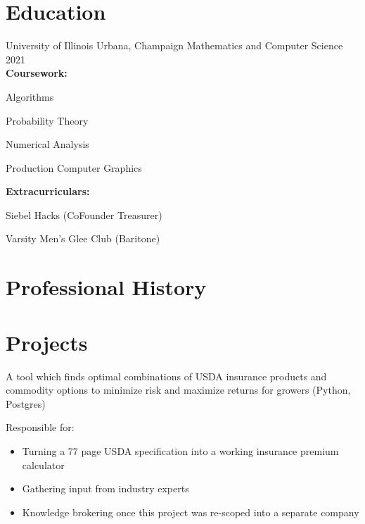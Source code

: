 \documentclass[hidelinks]{scrartcl}
\begin{document}
\color{textcolor}

\flushleft
{\Huge\bfseries{\color{mycolor}{Adrian Herath}}}

{\small}



\section{Education}
\school
{University of Illinois}
{Urbana, Champaign}
{Mathematics and Computer Science}
{2021}
\\
\textbf{Coursework:} 
\begin{itemize*}
    \item[] Algorithms
    \item Probability Theory 
    \item Numerical Analysis
    \item Production Computer Graphics
\end{itemize*}
\textbf{Extracurriculars:} 
\begin{itemize*}
    \item[] Siebel Hacks (CoFounder Treasurer) 
    \item Varsity Men's Glee Club (Baritone)
\end{itemize*}



\section{Professional History}


\section{Projects}

{
    \item A tool which finds optimal combinations of USDA insurance products and commodity options
    to minimize risk and maximize returns for growers (Python, Postgres)
    \item Responsible for: 
    \begin{itemize}
        \item Turning a 77 page USDA specification into a working insurance premium calculator
        \item Gathering input from industry experts
        \item Knowledge brokering once this project was re-scoped into a separate company
    \end{itemize}
}
\end{document}
